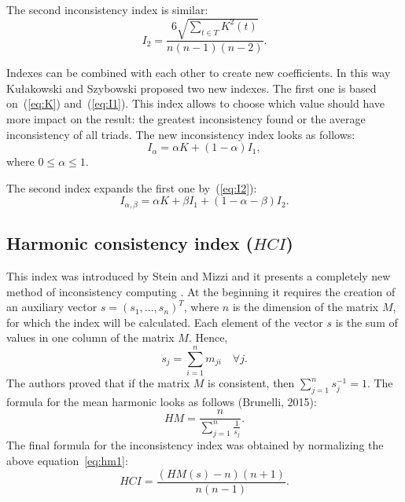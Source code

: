The second inconsistency index is similar:
	\begin{equation} 
	 \label{eq:I2}				
		I_{2}=\frac{6\sqrt{\sum_{t\in T}K^{2}(t)}}{n(n-1)(n-2)}.
	 \end{equation}

Indexes can be combined with each other to create new coefficients. In this way Kułakowski and Szybowski proposed two new indexes. The first one is based on~(\ref{eq:K}) and~(\ref{eq:I1}). This index allows to choose which value should have more impact on the result: the greatest inconsistency found or the average inconsistency of all triads. The new inconsistency index looks as follows:
	\begin{equation} 
		I_{\alpha}=\alpha K+(1-\alpha)I_{1},
	 \end{equation}
 where $0\leq\alpha\leq1$.
  
The second index expands the first one by~(\ref{eq:I2}):
	\begin{equation} 
		I_{\alpha,\beta}=\alpha K+\beta I_{1}+(1-\alpha-\beta)I_{2}.
	 \end{equation}
 

\subsection{Harmonic consistency index ($\textit{HCI}$)}

This index was introduced by Stein and Mizzi and it presents a completely new method of inconsistency computing \cite{STEIN2007}. At the beginning it requires the creation of an auxiliary vector $s=(s_{1},...,s_{n})^{T}$, where $n$ is the dimension of the matrix $M$, for which the index will be calculated. Each element of the vector $s$ is the sum of values in one column of the matrix $M$. Hence, 
	\begin{equation} 
		s_{j}=\sum_{i=1}^{n}m_{ji}\,\,\,\,\,\,\forall j.
	 \end{equation}
 The authors proved that if the matrix $M$ is consistent, then $\sum_{j=1}^{n}s_{j}^{-1}=1$. The formula for the mean harmonic looks as follows (Brunelli, 2015):
	 \begin{equation} 
		\label{eq:hm1}
		\textit{HM}=\frac{n}{\sum_{j=1}^{n}\frac{1}{s_{j}}}.
	 \end{equation}
 The final formula for the inconsistency index was obtained by normalizing the above equation~\ref{eq:hm1}:
 	\begin{equation} 
		\textit{HCI}=\frac{\left(HM(s)-n\right)\left(n+1\right)}{n(n-1)}.
	 \end{equation}
 

